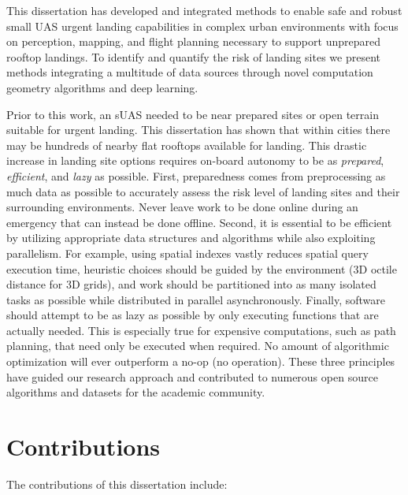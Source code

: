 This dissertation has developed and integrated methods to enable safe and robust small UAS urgent landing capabilities in complex urban environments with focus on perception, mapping, and flight planning necessary to support unprepared rooftop landings. To identify and quantify the risk of landing sites we present methods integrating a multitude of data sources through novel computation geometry algorithms and deep learning. 

Prior to this work, an sUAS needed to be near prepared sites or open terrain suitable for urgent landing. This dissertation has shown that within cities there may be hundreds of nearby flat rooftops available for landing. This drastic increase in landing site options requires on-board autonomy to be as \emph{prepared}, \emph{efficient}, and \emph{lazy} as possible. First, preparedness comes from preprocessing as much data as possible to accurately assess the risk level of landing sites and their surrounding environments. Never leave work to be done online during an emergency that can instead be done offline. Second, it is essential to be efficient by utilizing appropriate data structures and algorithms while also exploiting parallelism. For example, using spatial indexes vastly reduces spatial query execution time, heuristic choices should be guided by the environment (3D octile distance for 3D grids), and work should be partitioned into as many isolated tasks as possible while distributed in parallel asynchronously. Finally, software should attempt to be as lazy as possible by only executing functions that are actually needed. This is especially true for expensive computations, such as path planning, that need only be executed when required. No amount of algorithmic optimization will ever outperform a no-op (no operation).  These three principles have guided our research approach and contributed to numerous open source algorithms and datasets for the academic community. 


\section{Contributions}

The contributions of this dissertation include:


